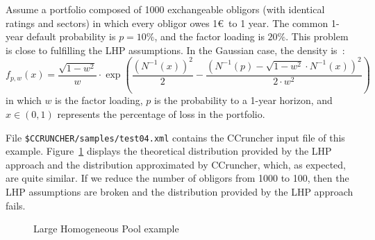 \documentclass[11pt,fleqn]{book} %
\begin{document}
\begin{example}
	\label{ex:test04}
	Assume a portfolio composed of \num{1000} exchangeable obligors (with 
	identical ratings and sectors) in which every obligor owes 1\euro\ to 
	1 year. The common 1-year default probability is $p=10\%$, and the factor 
	loading is $20\%$. This problem is close to fulfilling the LHP assumptions. 
	In the Gaussian case, the density is~\cite[chap. 2.5]{bluhm:2002}: 
	\begin{displaymath}
		f_{p,w}(x) = 
		\frac{\sqrt{1-w^2}}{w} \cdot \exp\left( 
			\frac{\left(N^{-1}(x)\right)^2}{2} -
			\frac{\left(N^{-1}(p) - \sqrt{1-w^2} \cdot N^{-1}(x)\right)^2}{2 \cdot w^2}
		\right)
	\end{displaymath}
	in which $w$ is the factor loading, $p$ is the probability to a 1-year 
	horizon, and $x \in (0,1)$ represents the percentage of loss in the 
	portfolio. 

	File \texttt{\$CCRUNCHER/samples/test04.xml} contains the CCruncher input
	file of this example. Figure~\ref{fig:test04} displays the theoretical
	distribution provided by the LHP approach and the distribution approximated 
	by CCruncher, which, as expected, are quite similar. If we reduce the number 
	of obligors from \num{1000} to \num{100}, then the LHP assumptions are 
	broken and the distribution provided by the LHP approach fails.
	\begin{figure}[!ht]
		\centering
		\caption{Large Homogeneous Pool example}
		\label{fig:test04} 
	\end{figure}
\end{example}

\end{document}
